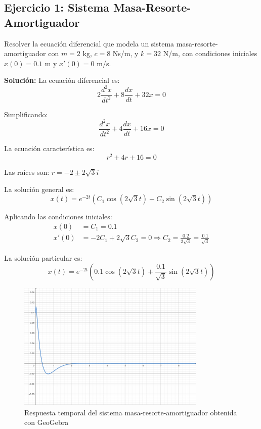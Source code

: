 \documentclass[12pt]{article}
\begin{document}
\subsection{Ejercicio 1: Sistema Masa-Resorte-Amortiguador}

Resolver la ecuación diferencial que modela un sistema masa-resorte-amortiguador con $m = 2$ kg, $c = 8$ Ns/m, y $k = 32$ N/m, con condiciones iniciales $x(0) = 0.1$ m y $x'(0) = 0$ m/s.

\textbf{Solución:}
La ecuación diferencial es:
\begin{equation}
    2 \frac{d^2 x}{dt^2} + 8 \frac{dx}{dt} + 32x = 0
\end{equation}

Simplificando:
\begin{equation}
    \frac{d^2 x}{dt^2} + 4 \frac{dx}{dt} + 16x = 0
\end{equation}

La ecuación característica es:
\begin{equation}
    r^2 + 4r + 16 = 0
\end{equation}

Las raíces son: $r = -2 \pm 2\sqrt{3}i$

La solución general es:
\begin{equation}
    x(t) = e^{-2t} (C_1 \cos(2\sqrt{3}t) + C_2 \sin(2\sqrt{3}t))
\end{equation}

Aplicando las condiciones iniciales:
\begin{align}
    x(0) &= C_1 = 0.1 \\
    x'(0) &= -2C_1 + 2\sqrt{3}C_2 = 0 \Rightarrow C_2 = \frac{0.2}{2\sqrt{3}} = \frac{0.1}{\sqrt{3}}
\end{align}

La solución particular es:
\begin{equation}
    x(t) = e^{-2t} \left(0.1 \cos(2\sqrt{3}t) + \frac{0.1}{\sqrt{3}} \sin(2\sqrt{3}t)\right)
\end{equation}

\begin{figure}[H]
    \centering
    \includegraphics[width=0.8\textwidth]{imagen-ejercicio1.png}
    \caption{Respuesta temporal del sistema masa-resorte-amortiguador obtenida con GeoGebra}
\end{figure}
\end{document}
